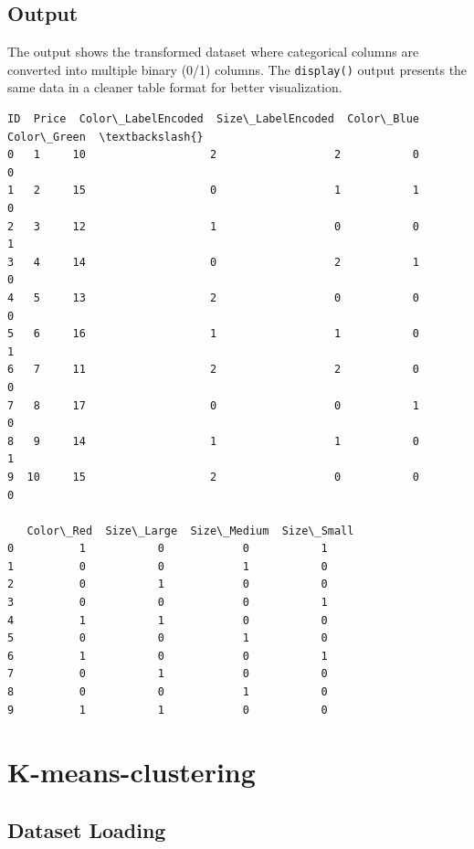 \documentclass[11pt]{article}
\begin{document}
 \subsection*{Output}
The output shows the transformed dataset where categorical columns are converted into multiple binary (0/1) columns. The \texttt{display()} output presents the same data in a cleaner table format for better visualization.
    \begin{Verbatim}[commandchars=\\\{\}]
   ID  Price  Color\_LabelEncoded  Size\_LabelEncoded  Color\_Blue  Color\_Green  \textbackslash{}
0   1     10                   2                  2           0            0   
1   2     15                   0                  1           1            0   
2   3     12                   1                  0           0            1   
3   4     14                   0                  2           1            0   
4   5     13                   2                  0           0            0   
5   6     16                   1                  1           0            1   
6   7     11                   2                  2           0            0   
7   8     17                   0                  0           1            0   
8   9     14                   1                  1           0            1   
9  10     15                   2                  0           0            0   

   Color\_Red  Size\_Large  Size\_Medium  Size\_Small  
0          1           0            0           1  
1          0           0            1           0  
2          0           1            0           0  
3          0           0            0           1  
4          1           1            0           0  
5          0           0            1           0  
6          1           0            0           1  
7          0           1            0           0  
8          0           0            1           0  
9          1           1            0           0  
    \end{Verbatim}

    

\section{K-means-clustering}\label{k-means-clustering}
\subsection{Dataset Loading}
\end{document}
